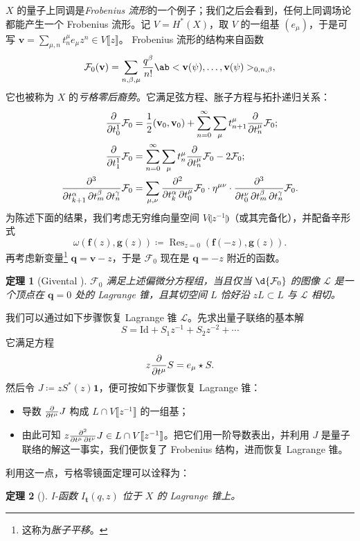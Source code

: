 \documentclass{amsart}
\newtheorem{thm}{定理}[section]
\theoremstyle{definition}
\theoremstyle{remark}
\theoremstyle{plain}
\theoremstyle{definition}
\theoremstyle{remark}
\newcommand{\mc}[1]{\mathcal{#1}}
\newcommand{\mbf}[1]{\mathbf{#1}}
\newcommand{\bv}{\mbf{v}}
\newcommand{\bq}{\mbf{q}}
\newcommand{\mr}[1]{\mathrm{#1}}
\newcommand{\on}[1]{\operatorname{#1}}
\newcommand{\1}{\mathbf{1}}
\newcommand{\2}{\mathbf{2}}
\newcommand{\3}{\mathbf{3}}
\newcommand{\ps}[1]{\llbracket #1 \rrbracket}
\newcommand{\ls}[1]{\llparenthesis #1 \rrparenthesis}
\begin{document}
\(X\) 的量子上同调是\textit{Frobenius 流形}的一个例子；我们之后会看到，任何上同调场论都能产生一个 Frobenius 流形。记 \(V = H^*(X)\)，取 \(V\) 的一组基 \((e_{\mu})\)，于是可写 $\bv = \sum_{\mu,n} t^{\mu}_n e_{\mu} z^n \in V\ps{z}$。
Frobenius 流形的结构来自函数
\[
    \mc{F}_0(\bv) = \sum_{n, \beta, \mu} \frac{q^{\beta}}{n!} \ab<\bv(\psi), \ldots, \bv(\psi)>_{0,n,\beta},
\]
它也被称为 \(X\) 的\textit{亏格零后裔势}。它满足弦方程、胀子方程与拓扑递归关系：
\begin{align*}
    \pdv{}{t_0^1} \mc{F}_0 &= \frac{1}{2} (\bv_0, \bv_0) + \sum_{n=0}^{\infty} \sum_{\mu} t_{n+1}^{\mu} \pdv{}{t_n^{\mu}} \mc{F}_0; \\
    \pdv{}{t_1^1} \mc{F}_0 &= \sum_{n=0}^{\infty} \sum_{\mu} t_n^{\mu} \pdv{}{t_n^{\mu}}\mc{F}_0 - 2 \mc{F}_0; \\
    \pdv{}{t_{k+1}^{\alpha},t_m^{\beta},t_n^{\gamma}} \mc{F}_0 &= \sum_{\mu,\nu} \pdv{}{t_k^{\alpha},t_0^{\mu}} \mc{F}_0 \cdot \eta^{\mu\nu} \cdot \pdv{}{t_0^{\nu},t_{m}^{\beta},t_n^{\gamma}} \mc{F}_0.
\end{align*}
为陈述下面的结果，我们考虑无穷维向量空间 $V\ls{z^{-1}}$（或其完备化），并配备辛形式
\[ \omega(\mbf{f}(z), \mbf{g}(z)) \coloneqq \on{Res}_{z=0}(\mbf{f}(-z), \mbf{g}(z)). \]
再考虑新变量\footnote{这称为\textit{胀子平移}。} $\bq = \bv - z$，于是 $\mc{F}_0$ 现在是 $\bq = -z$ 附近的函数。

\begin{thm}[Givental {\cite{Givental2004}}]
    $\mc{F}_0$ 满足上述偏微分方程组，当且仅当 $\d{\mc{F}_0}$ 的图像 $\mc{L}$ 是一个顶点在 $\bq = 0$ 处的 Lagrange 锥，且其切空间 $L$ 恰好沿 $zL \subset L$ 与 $\mc{L}$ 相切。
\end{thm}

我们可以通过如下步骤恢复 Lagrange 锥 $\mc{L}$。先求出量子联络的基本解
\[ S = \mr{Id} + S_1 z^{-1} + S_2 z^{-2} + \cdots \]
它满足方程
\[ z \pdv{}{t^{\mu}}S = e_{\mu} \star S. \]
然后令 $J \coloneqq z S^*(z) \1$，便可按如下步骤恢复 Lagrange 锥：
\begin{itemize}
    \item 导数 $\pdv{}{t^{\mu}} J$ 构成 $L \cap V\ps{z^{-1}}$ 的一组基；
    \item 由此可知 $z \pdv{}{t^{\mu},t^{\nu}} J \in L \cap V \ps{z^{-1}}$。把它们用一阶导数表出，并利用 $J$ 是量子联络的解这一事实，我们便恢复了 Frobenius 结构，进而恢复 Lagrange 锥。
\end{itemize}

利用这一点，亏格零镜面定理可以诠释为：
\begin{thm}[{\cite{Givental1998}}]
    I-函数 \(I_{\mbf{t}}(q,z)\) 位于 \(X\) 的 Lagrange 锥上。
\end{thm}
\end{document}
